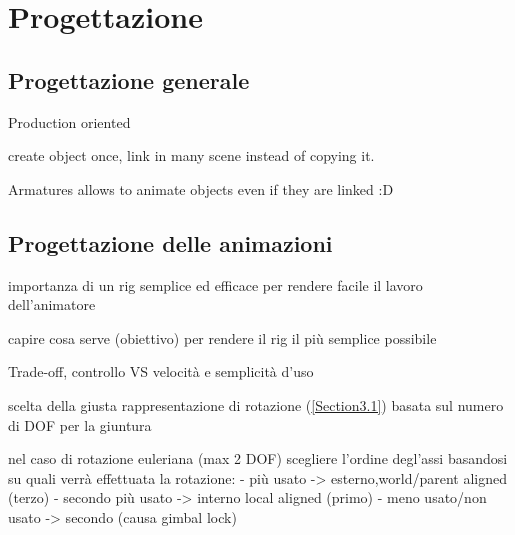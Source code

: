 
\chapter{Progettazione} %

\label{Chapter4} %


\section{Progettazione generale}

Production oriented

create object once, link in many scene instead of copying it.

Armatures allows to animate objects even if they are linked :D

\section{Progettazione delle animazioni}

importanza di un rig semplice ed efficace per rendere facile il lavoro dell'animatore

capire cosa serve (obiettivo) per rendere il rig il più semplice possibile

Trade-off, controllo VS velocità e semplicità d'uso

scelta della giusta rappresentazione di rotazione (\ref{Section3.1}) basata sul numero di DOF per la giuntura

nel caso di rotazione euleriana (max 2 DOF) scegliere l'ordine degl'assi basandosi su quali verrà effettuata la rotazione:
- più usato -> esterno,world/parent aligned (terzo)
- secondo più usato -> interno local aligned (primo)
- meno usato/non usato -> secondo (causa gimbal lock)